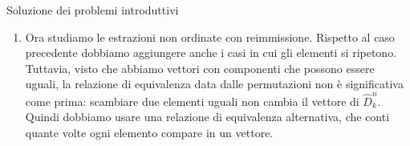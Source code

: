 \documentclass[a4paper]{article}
\begin{document}
\begin{snippetsolution}{Soluzione dei problemi introduttivi}
\begin{enumerate}
            Quindi
            \[
                |C_k^n|
                =
                \frac{n!}{(n-k)!k!}
                =
                \binom{n}{k}.
            \]
            Per il lotto si estraggono \(5\) numeri da \(90\), senza reimmissione e senza considerare l'ordine.
            Pertanto il numero di cinquine possibili è
            \[
                \binom{90}{5}
                =
                43\,949\,268.
            \]
        \item Ora studiamo le estrazioni non ordinate con reimmissione.
            Rispetto al caso precedente dobbiamo aggiungere anche i casi in cui gli elementi si ripetono.
            Tuttavia, visto che abbiamo vettori con componenti che possono essere uguali, la relazione di equivalenza data dalle permutazioni non è significativa come prima: scambiare due elementi uguali non cambia il vettore di \(\hat D_k^n\).
            Quindi dobbiamo usare una relazione di equivalenza alternativa, che conti quante volte ogni elemento compare in un vettore.


\end{enumerate}
\end{snippetsolution}
\end{document}
